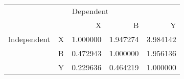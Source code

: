 \begin{tabular}{llrrr}
\toprule
            &   & \multicolumn{3}{l}{Dependent} \\
            &   &         X &         B &         Y \\
\midrule
Independent & X &  1.000000 &  1.947274 &  3.984142 \\
            & B &  0.472943 &  1.000000 &  1.956136 \\
            & Y &  0.229636 &  0.464219 &  1.000000 \\
\bottomrule
\end{tabular}

